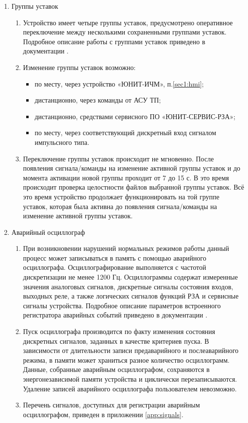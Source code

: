 \begin{enumerate}[label=\arabic{section}.\arabic{subsection}.\arabic*, labelsep=7pt, leftmargin=0pt, itemindent=60pt, align=left]
\item Группы уставок
\begin{enumerate}
\item Устройство имеет четыре группы уставок, предусмотрено оперативное переключение между несколькими сохраненными группами уставок. Подробное описание работы с группами уставок приведено в документации \ManualUnitGeneral.
\item Изменение группы уставок возможно:
\begin{itemize}
  \item по месту, через устройство «ЮНИТ-ИЧМ», п.\ref{sec1:hmi};
  \item дистанционно, через команды от АСУ ТП;
  \item дистанционно, средствами сервисного ПО «ЮНИТ-СЕРВИС-РЗА»;
  \item по месту, через соответствующий дискретный вход сигналом импульсного типа.
\end{itemize}
\item Переключение группы уставок происходит не мгновенно.
После появления сигнала/команды на изменение активной группы уставок и до момента активации новой группы проходит от 7 до 15 с.
В это время происходит проверка целостности файлов выбранной группы уставок.
Всё это время устройство продолжает функционировать на той группе уставок, которая была активна до появления сигнала/команды на изменение активной группы уставок.
\end{enumerate}

\item Аварийный осциллограф
\begin{enumerate}
\item При возникновении нарушений нормальных режимов работы данный процесс может записываться в память с помощью аварийного осциллографа.
Осциллографирование выполняется с частотой дискретизации не менее 1200 Гц.
Осциллограммы содержат измеренные значения аналоговых сигналов, дискретные сигналы состояния входов, выходных реле, а также логических сигналов функций РЗА и сервисные сигналы устройства.
Подробное описание параметров встроенного регистратора аварийных событий приведено в документации \ManualUnitGeneral.
\item Пуск осциллографа производится по факту изменения состояния дискретных сигналов, заданных в качестве критериев пуска.
В зависимости от длительности записи предаварийного и послеаварийного режима, в памяти может храниться разное количество осциллограмм.
Данные, собранные аварийным осциллографом, сохраняются в энергонезависимой памяти устройства и циклически перезаписываются.
Удаление записей аварийного осциллографа пользователем невозможно.
\item Перечень сигналов, доступных для регистрации аварийным осциллографом, приведен в приложении \ref{app:signals}.
\end{enumerate}


\end{enumerate}
